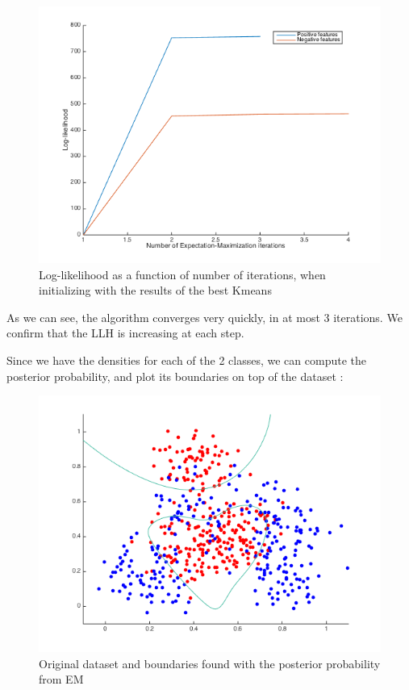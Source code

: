 \documentclass[a4paper, 12pt]{article}
\begin{document}
\begin{figure}[H]
	\centering
	\noindent\includegraphics[scale=0.6]{llh.png}
	\caption{Log-likelihood as a function of number of iterations, when initializing with the results of the best Kmeans}
\end{figure}
As we can see, the algorithm converges very quickly, in at most 3 iterations. We confirm that the LLH is increasing at each step.

Since we have the densities for each of the 2 classes, we can compute the posterior probability, and plot its boundaries on top of the dataset :
\begin{figure}[H]
	\centering
	\noindent\includegraphics[scale=0.6]{boundaries.png}
	\caption{Original dataset and boundaries found with the posterior probability from EM}
\end{figure}
\end{document}

